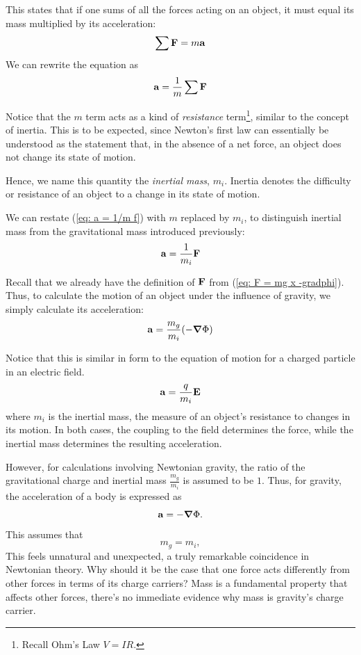 		This states that if one sums of all the forces acting on an object, 
		it must equal its mass multiplied by its acceleration:
		\begin{equation}
			\sum\vb{F} = m\vb{a}
		\end{equation}
		We can rewrite the equation as
		\begin{equation}
			\vb{a} = \frac{1}{m} \sum \vb{F}
			\label{eq: a = 1/m f}
		\end{equation}

		Notice that the $m$ term acts as a kind of \textit{resistance} term\footnote{Recall Ohm's Law $V = IR$.}, similar to the concept of inertia. This is to be expected, since Newton's first law can essentially be understood as the statement that, in the absence of a net force, an object does not change its state of motion.

		Hence, we name this quantity the \textit{inertial mass}, $m_i$. Inertia denotes the difficulty or resistance of an object to a change in its state of motion.

		We can restate (\ref{eq: a = 1/m f}) with $m$ replaced by $m_i$, to distinguish inertial mass from the gravitational mass introduced previously:
		\begin{equation}
			\vb{a} = \frac{1}{m_i} \vb{{F}}
		\end{equation}

		Recall that we already have the definition of $\vb{F}$ from (\ref{eq: F = mg x -gradphi}). Thus, to calculate the motion of an object under the influence of gravity, we simply calculate its acceleration:
		\begin{equation}
			\vb{a} = \frac{m_g}{m_i}\qty(-\grad\Phi)
		\end{equation}

		Notice that this is similar in form to the equation of motion for a charged particle in an electric field.
		\begin{equation}
			\vb{a} = \frac{q}{m_i}\vb{E}
		\end{equation}
		where $m_i$ is the inertial mass, the measure of an object's resistance to changes in its motion. In both cases, the coupling to the field determines the force, while the inertial mass determines the resulting acceleration.

		However, for calculations involving Newtonian gravity, the ratio of the gravitational charge and inertial mass
		$\displaystyle \frac{m_g}{m_i}$ is assumed to be $1$. Thus, for gravity, the acceleration of a body is expressed as
		\begin{equation}
			\vb{a} = -\grad\Phi.
		\end{equation}
		This assumes that
		\begin{equation}
			m_g = m_i,
		\end{equation}
		This feels unnatural and unexpected, a truly remarkable coincidence in Newtonian theory. Why should it be the case that one force acts differently from other forces in terms of its charge carriers?
		Mass is a fundamental property that affects other forces, there's no immediate evidence why mass is gravity's charge carrier.

